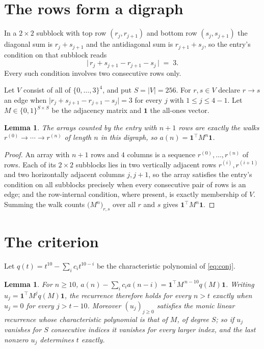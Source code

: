 \documentclass[11pt,a4paper]{article}
\theoremstyle{plain}
\newtheorem{lemma}[theorem]{Lemma}
\theoremstyle{definition}
\begin{document}
\section{The rows form a digraph}

In a $2\times2$ subblock with top row $(r_j,r_{j+1})$ and bottom row $(s_j,s_{j+1})$ the
diagonal sum is $r_j+s_{j+1}$ and the antidiagonal sum is $r_{j+1}+s_j$, so the entry's
condition on that subblock reads
\[
\bigl|\,r_j+s_{j+1}-r_{j+1}-s_j\,\bigr|\;=\;3.
\]
Every such condition involves two consecutive rows only.

Let $V$ consist of all of $\{0,\dots,3\}^{4}$, and put $S=|V|=256$. For $r,s\in V$ declare $r\to s$ an edge
when $\bigl|r_j+s_{j+1}-r_{j+1}-s_j\bigr|=3$ for every $j$ with
$1\le j\le4-1$. Let $M\in\{0,1\}^{S\times S}$ be the adjacency matrix and $\mathbf{1}$
the all-ones vector.

\begin{lemma}\label{lem:walk}
The arrays counted by the entry with $n+1$ rows are exactly the walks
$r^{(0)}\to\cdots\to r^{(n)}$ of length $n$ in this digraph, so
$a(n)=\mathbf{1}^{\!\top}M^{n}\mathbf{1}$.
\end{lemma}

\begin{proof}
An array with $n+1$ rows and $4$ columns is a sequence $r^{(0)},\dots,r^{(n)}$ of
rows. Each of its $2\times2$ subblocks lies in two vertically adjacent rows
$r^{(i)},r^{(i+1)}$ and two horizontally adjacent columns $j,j+1$, so the array satisfies
the entry's condition on all subblocks precisely when every consecutive pair of rows is an
edge; and the row-internal condition, where present, is exactly membership of $V$. Summing
the walk counts $\bigl(M^{n}\bigr)_{r,s}$ over all $r$ and $s$ gives
$\mathbf{1}^{\!\top}M^{n}\mathbf{1}$.
\end{proof}

\section{The criterion}

Let $q(t)=t^{10}-\sum_i c_i t^{10-i}$ be the characteristic polynomial of
\eqref{eq:conj}.

\begin{lemma}\label{lem:crit}
For $n\ge10$,
$a(n)-\sum_i c_i a(n-i)=\mathbf{1}^{\!\top}M^{\,n-10}q(M)\mathbf{1}$. Writing
$u_j=\mathbf{1}^{\!\top}M^{j}q(M)\mathbf{1}$, the recurrence therefore holds for every
$n>t$ exactly when $u_j=0$ for every $j>t-10$. Moreover $(u_j)_{j\ge0}$ satisfies the
monic linear recurrence whose characteristic polynomial is that of $M$, of degree $S$; so
if $u_j$ vanishes for $S$ consecutive indices it vanishes for every larger index, and the
last nonzero $u_j$ determines $t$ exactly.
\end{lemma}
\end{document}
